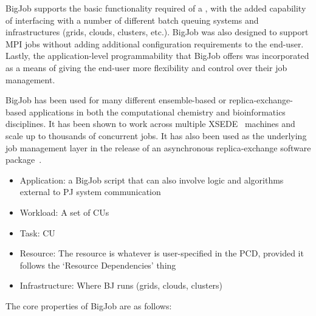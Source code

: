 \documentclass{sig-alternate}
\begin{document}
BigJob supports the basic functionality required of a \pilotjob, with
the added capability of interfacing with a number of different batch
queuing systems and infrastructures (grids, clouds, clusters, etc.).
BigJob was also designed to support MPI jobs without adding additional
configuration requirements to the end-user.  Lastly, the
application-level programmability that BigJob offers was incorporated
as a means of giving the end-user more flexibility and control over
their job management.

BigJob has been used for many different ensemble-based or
replica-exchange-based applications in both the computational
chemistry and bioinformatics disciplines. It has been shown to work
across multiple XSEDE~\cite{xsede_url} machines and scale up to
thousands of concurrent jobs. It has also been used as the underlying
job management layer in the release of an asynchronous
replica-exchange software package~\cite{2013-xsede-cdi}.

\begin{itemize}
\item Application: a BigJob script that can also involve logic and algorithms
external to PJ system communication
\item Workload: A set of CUs
\item Task: CU
\item Resource: The resource is whatever is user-specified in the PCD, provided it
follows the `Resource Dependencies' thing
\item Infrastructure: Where BJ runs (grids, clouds, clusters)
\end{itemize}

The core properties of BigJob are as follows:
\end{document}
